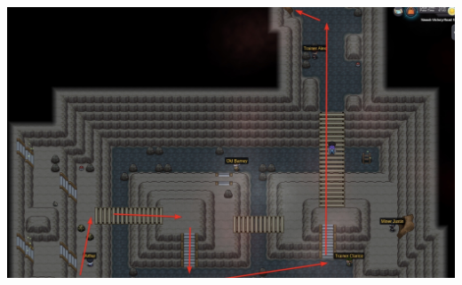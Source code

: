 \documentclass[11pt]{article}
\begin{document}
\includegraphics[width=\textwidth]{walkthrough/Sinnoh/victory-road-2}



% 
% 



\thispagestyle{empty}
\listoffigures
\listoftables
\newpage
{}
\end{document}
